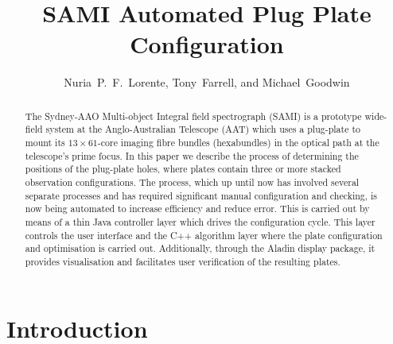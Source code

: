 
\resetcounters




\title{SAMI Automated Plug Plate Configuration}

\author{Nuria~P.~F.~Lorente, Tony~Farrell, and Michael~Goodwin
}


\begin{abstract} The Sydney-AAO Multi-object Integral field spectrograph (SAMI) is a prototype wide-field system at the Anglo-Australian Telescope (AAT) which uses a plug-plate to mount its $13 \times 61$-core imaging fibre bundles (hexabundles) in the optical path at the telescope's prime focus. In this paper we describe the process of determining the positions of the plug-plate holes, where plates contain three or more stacked observation configurations. The process, which up until now has involved several separate processes and has required significant manual configuration and checking, is now being automated to increase efficiency and reduce error. This is carried out by means of a thin Java controller layer which drives the configuration cycle. This layer controls the user interface and the C++ algorithm layer where the plate configuration and optimisation is carried out. Additionally, through the Aladin display package, it provides visualisation and facilitates user verification of the resulting plates.
\end{abstract}

\section{Introduction}

